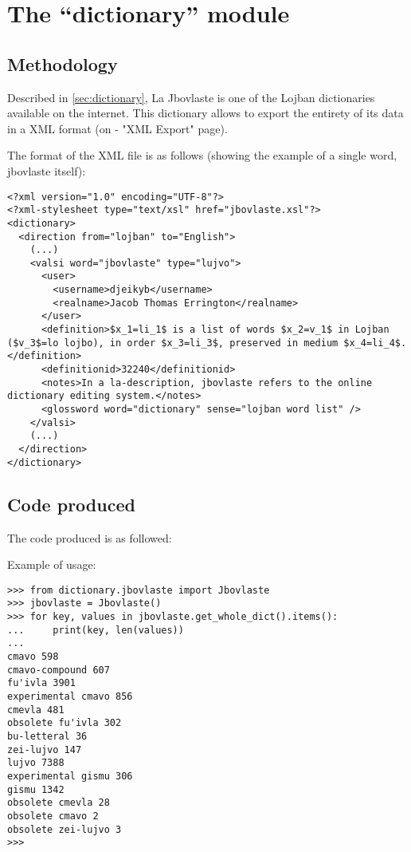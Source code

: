 \chapter{The ``dictionary'' module}

\section{Methodology}

\label{sub:creating_a_dictionary}

Described in \ref{sec:dictionary}, La Jbovlaste is one of the Lojban dictionaries available on the internet.
This dictionary allows to export the entirety of its data in a XML format (on \cite{jbovlaste} - "XML Export" page).\\

\newpage

The format of the XML file is as follows (showing the example of a single word, jbovlaste itself): \\

\begin{lstlisting}
<?xml version="1.0" encoding="UTF-8"?>
<?xml-stylesheet type="text/xsl" href="jbovlaste.xsl"?>
<dictionary>
  <direction from="lojban" to="English">
    (...)
    <valsi word="jbovlaste" type="lujvo">
      <user>
        <username>djeikyb</username>
        <realname>Jacob Thomas Errington</realname>
      </user>
      <definition>$x_1=li_1$ is a list of words $x_2=v_1$ in Lojban ($v_3$=lo lojbo), in order $x_3=li_3$, preserved in medium $x_4=li_4$.</definition>
      <definitionid>32240</definitionid>
      <notes>In a la-description, jbovlaste refers to the online dictionary editing system.</notes>
      <glossword word="dictionary" sense="lojban word list" />
    </valsi>
    (...)
  </direction>
</dictionary>
\end{lstlisting}

\newpage

\section{Code produced}

The code produced is as followed:



Example of usage:

\begin{lstlisting}
>>> from dictionary.jbovlaste import Jbovlaste
>>> jbovlaste = Jbovlaste()
>>> for key, values in jbovlaste.get_whole_dict().items():
...     print(key, len(values))
...
cmavo 598
cmavo-compound 607
fu'ivla 3901
experimental cmavo 856
cmevla 481
obsolete fu'ivla 302
bu-letteral 36
zei-lujvo 147
lujvo 7388
experimental gismu 306
gismu 1342
obsolete cmevla 28
obsolete cmavo 2
obsolete zei-lujvo 3
>>>
\end{lstlisting}

